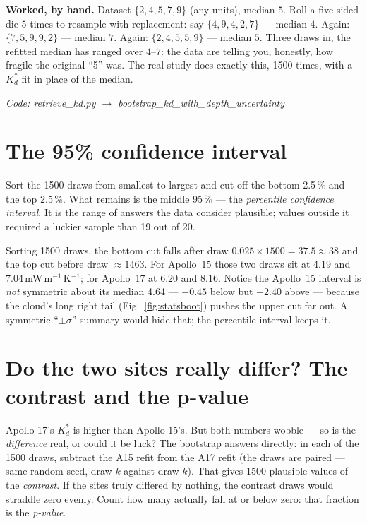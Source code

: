 \documentclass[11pt]{report}
\newcommand{\code}[1]{{\ttfamily\small #1}}
\begin{document}
\medskip
\noindent\textbf{Worked, by hand.} Dataset $\{2, 4, 5, 7, 9\}$ (any units),
median $5$. Roll a five-sided die $5$ times to resample with replacement: say
$\{4, 9, 4, 2, 7\}$ --- median $4$. Again: $\{7, 5, 9, 9, 2\}$ --- median $7$.
Again: $\{2, 4, 5, 5, 9\}$ --- median $5$. Three draws in, the refitted median
has ranged over $4$--$7$: the data are telling you, honestly, how fragile the
original ``5'' was. The real study does exactly this, 1500 times, with a
$K_d^{*}$ fit in place of the median.

{\small\color{dim}\textit{Code: \code{retrieve\_kd.py} $\to$
\code{bootstrap\_kd\_with\_depth\_uncertainty}}}

\section{The 95\% confidence interval}\label{sec:cizero}

\begin{plain}
Sort the 1500 draws from smallest to largest and cut off the bottom
2.5\,\% and the top 2.5\,\%. What remains is the middle 95\,\% --- the
\emph{percentile confidence interval}. It is the range of answers the data
consider plausible; values outside it required a luckier sample than 19 out
of 20.
\end{plain}

Sorting 1500 draws, the bottom cut falls after draw
$0.025 \times 1500 = 37.5 \approx 38$ and the top cut before draw
$\approx 1463$. For Apollo~15 those two draws sit at 4.19 and
7.04\,mW\,m$^{-1}$\,K$^{-1}$; for Apollo~17 at 6.20 and 8.16. Notice the
Apollo~15 interval is \emph{not} symmetric about its median 4.64 ---
$-0.45$ below but $+2.40$ above --- because the cloud's long right tail
(Fig.~\ref{fig:statsboot}) pushes the upper cut far out. A symmetric
``$\pm\sigma$'' summary would hide that; the percentile interval keeps it.

\section{Do the two sites really differ? The contrast and the
p-value}\label{sec:pzero}

\begin{plain}
Apollo 17's $K_d^{*}$ is higher than Apollo 15's. But both numbers wobble ---
so is the \emph{difference} real, or could it be luck? The bootstrap answers
directly: in each of the 1500 draws, subtract the A15 refit from the A17
refit (the draws are paired --- same random seed, draw $k$ against draw $k$).
That gives 1500 plausible values of the \emph{contrast}. If the sites truly
differed by nothing, the contrast draws would straddle zero evenly. Count how
many actually fall at or below zero: that fraction is the \emph{p-value}.
\end{plain}
\end{document}
